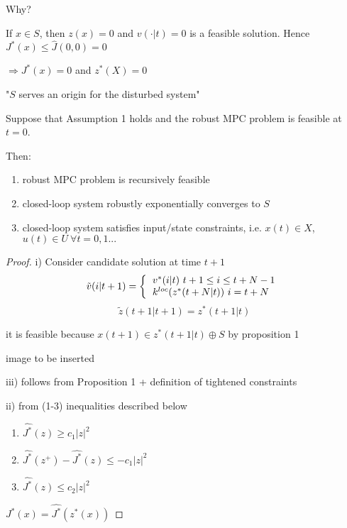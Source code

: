 Why? 

If $x \in S$, then $z(x) = 0$ and $v(\cdot|t) = 0$ is a feasible solution. Hence $J^*(x) \leq \hat{J}(0,0) = 0$

$\Rightarrow J^*(x) = 0$ and $z^*(X) = 0$

"$S$ serves an origin for the disturbed system"

\begin{Theorem}Suppose that Assumption 1 holds and the robust MPC problem is feasible at $t = 0$.

Then: 
\begin{enumerate}[label=(\roman*)]
\item robust MPC problem is recursively feasible
\item closed-loop system robustly exponentially converges to $S$
\item closed-loop system satisfies input/state constraints, i.e. $x(t) \in X$, $u(t) \in U \ \forall t = 0,1 ...$
\end{enumerate} 

\begin{proof}

i) Consider candidate solution at time $t+1$ 
\begin{equation*}
\tilde{v}(i|t+1) = \left \{
  \begin{tabular}{l}
  $v^*(i|t) \ t+1 \leq i \leq t+ N -1$ \\
  $k^{loc}(z^*(t+N|t)) \ i = t + N$
  \end{tabular}
\right .
\end{equation*}
\begin{equation*}
\tilde{z}(t+1 | t+1) = z^*(t+1|t)
\end{equation*}

it is feasible because $x(t+1) \in z^*(t+1|t) \oplus S$ by proposition 1

image to be inserted


iii) follows from Proposition 1 + definition of tightened constraints


ii) from (1-3) inequalities described below

\begin{enumerate}
\item $\hat{J^*}(z) \geq c_1|z|^2$
\item $\hat{J^*}(z^+) - \hat{J^*}(z) \leq - c_1 |z|^2$
\item $\hat{J^*}(z) \leq c_2|z|^2$
\end{enumerate}

$J^*(x) = \hat{J^*}(z^*(x))$


\end{proof}
\end{Theorem}
